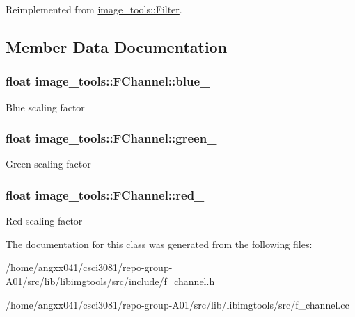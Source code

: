 Reimplemented from \hyperlink{classimage__tools_1_1Filter_afd5d1be5736e343077d331896d4130d9}{image\+\_\+tools\+::\+Filter}.



\subsection{Member Data Documentation}
\subsubsection[{\texorpdfstring{blue\+\_\+}{blue_}}]{\setlength{\rightskip}{0pt plus 5cm}float image\+\_\+tools\+::\+F\+Channel\+::blue\+\_\+\hspace{0.3cm}{\ttfamily [private]}}\hypertarget{classimage__tools_1_1FChannel_a3eb08bcf47005e1672b4516b0c75d7a9}{}\label{classimage__tools_1_1FChannel_a3eb08bcf47005e1672b4516b0c75d7a9}
Blue scaling factor 
\subsubsection[{\texorpdfstring{green\+\_\+}{green_}}]{\setlength{\rightskip}{0pt plus 5cm}float image\+\_\+tools\+::\+F\+Channel\+::green\+\_\+\hspace{0.3cm}{\ttfamily [private]}}\hypertarget{classimage__tools_1_1FChannel_a42ef11eef9bfad14df5007959047ccc6}{}\label{classimage__tools_1_1FChannel_a42ef11eef9bfad14df5007959047ccc6}
Green scaling factor 
\subsubsection[{\texorpdfstring{red\+\_\+}{red_}}]{\setlength{\rightskip}{0pt plus 5cm}float image\+\_\+tools\+::\+F\+Channel\+::red\+\_\+\hspace{0.3cm}{\ttfamily [private]}}\hypertarget{classimage__tools_1_1FChannel_a6d2b5a5e5bffb3673df6191cf642f337}{}\label{classimage__tools_1_1FChannel_a6d2b5a5e5bffb3673df6191cf642f337}
Red scaling factor 

The documentation for this class was generated from the following files\+:\begin{DoxyCompactItemize}
\item 
/home/angxx041/csci3081/repo-\/group-\/\+A01/src/lib/libimgtools/src/include/f\+\_\+channel.\+h\item 
/home/angxx041/csci3081/repo-\/group-\/\+A01/src/lib/libimgtools/src/f\+\_\+channel.\+cc\end{DoxyCompactItemize}
